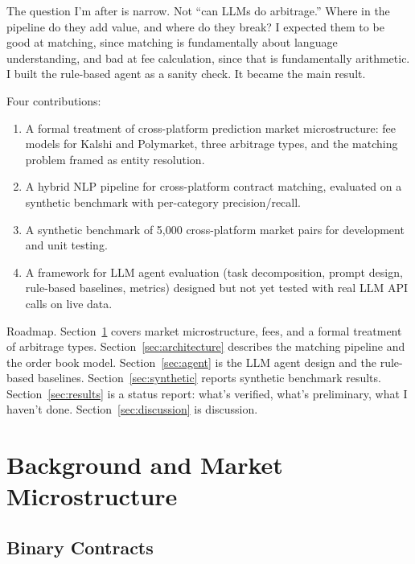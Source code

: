 \documentclass[11pt]{article}
\theoremstyle{definition}
\theoremstyle{remark}
\begin{document}
The question I'm after is narrow. Not ``can LLMs do arbitrage.'' Where in the pipeline do they add value, and where do they break? I expected them to be good at matching, since matching is fundamentally about language understanding, and bad at fee calculation, since that is fundamentally arithmetic. I built the rule-based agent as a sanity check. It became the main result.

Four contributions:
\begin{enumerate}
  \item A formal treatment of cross-platform prediction market microstructure: fee models for Kalshi and Polymarket, three arbitrage types, and the matching problem framed as entity resolution.
  \item A hybrid NLP pipeline for cross-platform contract matching, evaluated on a synthetic benchmark with per-category precision/recall.
  \item A synthetic benchmark of 5,000 cross-platform market pairs for development and unit testing.
  \item A framework for LLM agent evaluation (task decomposition, prompt design, rule-based baselines, metrics) designed but not yet tested with real LLM API calls on live data.
\end{enumerate}

Roadmap. Section~\ref{sec:background} covers market microstructure, fees, and a formal treatment of arbitrage types. Section~\ref{sec:architecture} describes the matching pipeline and the order book model. Section~\ref{sec:agent} is the LLM agent design and the rule-based baselines. Section~\ref{sec:synthetic} reports synthetic benchmark results. Section~\ref{sec:results} is a status report: what's verified, what's preliminary, what I haven't done. Section~\ref{sec:discussion} is discussion.

\section{Background and Market Microstructure}
\label{sec:background}

\subsection{Binary Contracts}
\label{sec:binary}
\end{document}
